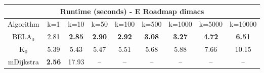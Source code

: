\begin{tabular}{c|cccccccc}\toprule
\multicolumn{9}{c}{Runtime (seconds) - E Roadmap dimacs}\\ \midrule
Algorithm & k=1 & k=10 & k=50 & k=100 & k=500 & k=1000 & k=5000 & k=10000 \\ \midrule
BELA$_0$ & 2.81 & \textbf{2.85} & \textbf{2.90} & \textbf{2.92} & \textbf{3.08} & \textbf{3.27} & \textbf{4.72} & \textbf{6.51} \\
K$_0$ & 5.39 & 5.43 & 5.47 & 5.51 & 5.68 & 5.88 & 7.66 & 10.15 \\
mDijkstra & \textbf{2.56} & 17.93 & -- & -- & -- & -- & -- & -- \\ \bottomrule 
\end{tabular}
